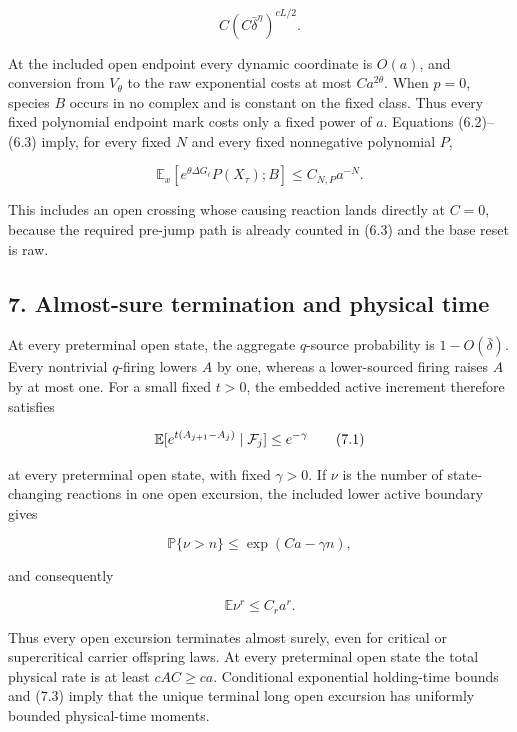 \[
                    C(C\bar\delta^\eta)^{cL/2}.             \tag{6.3}
\]

At the included open endpoint every dynamic coordinate is \(O(a)\), and
conversion from \(V_\theta\) to the raw exponential costs at most
\(Ca^{2\theta}\). When \(p=0\), species \(B\) occurs in no complex and
is constant on the fixed class. Thus every fixed polynomial endpoint
mark costs only a fixed power of \(a\). Equations (6.2)--(6.3) imply,
for every fixed \(N\) and every fixed nonnegative polynomial \(P\),

\[
 \mathbb E_x[e^{\theta\Delta G_\ell}P(X_\tau);B]
                         \le C_{N,P}a^{-N}.                 \tag{6.4}
\]

This includes an open crossing whose causing reaction lands directly at
\(C=0\), because the required pre-jump path is already counted in (6.3)
and the base reset is raw.

\subsection{7. Almost-sure termination and physical
time}

At every preterminal open state, the aggregate \(q\)-source probability
is \(1-O(\bar\delta)\). Every nontrivial \(q\)-firing lowers \(A\) by
one, whereas a lower-sourced firing raises \(A\) by at most one. For a
small fixed \(t>0\), the embedded active increment therefore satisfies

\[
        \mathbb E[e^{t(A_{j+1}-A_j)}\mid{\cal F}_j]
                      \le e^{-\gamma}                       \tag{7.1}
\]

at every preterminal open state, with fixed \(\gamma>0\). If \(\nu\) is
the number of state-changing reactions in one open excursion, the
included lower active boundary gives

\[
                    \mathbb P\{\nu>n\}
                       \le \exp(Ca-\gamma n),               \tag{7.2}
\]

and consequently

\[
                         \mathbb E\nu^r\le C_ra^r.          \tag{7.3}
\]

Thus every open excursion terminates almost surely, even for critical or
supercritical carrier offspring laws. At every preterminal open state
the total physical rate is at least \(cAC\ge ca\). Conditional
exponential holding-time bounds and (7.3) imply that the unique terminal
long open excursion has uniformly bounded physical-time moments.

